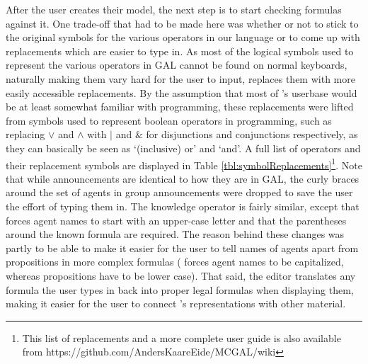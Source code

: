 After the user creates their model, the next step is to start checking formulas against it. One trade-off that had to be made here was whether or not to stick to the original symbols for the various operators in our language or to come up with replacements which are easier to type in. As most of the logical symbols used to represent the various operators in GAL cannot be found on normal keyboards, naturally making them vary hard for the user to input, \cname{} replaces them with more easily accessible replacements. By the assumption that most of \cname's userbase would be at least somewhat familiar with programming, these replacements were lifted from symbols used to represent boolean operators in programming, such as replacing $\vee$ and $\wedge$ with $|$ and $\&$ for disjunctions and conjunctions respectively, as they can basically be seen as `(inclusive) or' and `and'. A full list of operators and their replacement symbols are displayed in Table \ref{tbl:symbolReplacements}\footnote{This list of replacements and a more complete user guide is also available from https://github.com/AndersKaareEide/MCGAL/wiki}. Note that while announcements are identical to how they are in GAL, the curly braces around the set of agents in group announcements were dropped to save the user the effort of typing them in. The knowledge operator is fairly similar, except that \cname{} forces agent names to start with an upper-case letter and that the parentheses around the known formula are required. The reason behind these changes was partly to be able to make it easier for the user to tell names of agents apart from propositions in more complex formulas (\cname{} forces agent names to be capitalized, whereas propositions have to be lower case). That said, the editor translates any formula the user types in back into proper legal formulas when displaying them, making it easier for the user to connect \cname's representations with other material.



